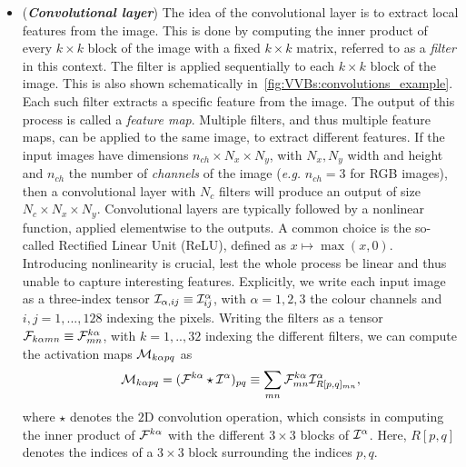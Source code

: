 \begin{itemize}
	\item (\textbf{\emph{Convolutional layer}})
		The idea of the convolutional layer is to extract local features from the image.
		This is done by computing the inner product of every $k\times k$ block of the image with a fixed $k\times k$ matrix, referred to as a \emph{filter} in this context. The filter is applied sequentially to each $k\times k$ block of the image. This is also shown schematically in~\cref{fig:VVBs:convolutions_example}.
		Each such filter extracts a specific feature from the image. The output of this process is called a \emph{feature map}. Multiple filters, and thus multiple feature maps, can be applied to the same image, to extract different features.
		If the input images have dimensions $n_{ch}\times N_x\times N_y$, with $N_x,N_y$ width and height and $n_{ch}$ the number of \emph{channels} of the image (\emph{e.g.} $n_{ch}=3$ for RGB images), then a convolutional layer with $N_c$ filters will produce an output of size $N_c\times N_x\times N_y$.
		Convolutional layers are typically followed by a nonlinear function, applied elementwise to the outputs. A common choice is the so-called Rectified Linear Unit (ReLU), defined as $x\mapsto\max(x,0)$.
		Introducing nonlinearity is crucial, lest the whole process be linear and thus unable to capture interesting features.
		Explicitly, we write each input image as a three-index tensor ${\mathcal{I}}_{\alpha,ij}\equiv{\mathcal{I}}^\alpha_{ij}$, with $\alpha=1,2,3$ the colour channels and $i,j=1,...,128$ indexing the pixels.
		Writing the filters as a tensor ${\mathcal{F}}_{k\alpha mn}\equiv{\mathcal{F}}^{k\alpha}_{mn}$, with $k=1,..,32$ indexing the different filters, we can compute the activation maps ${\mathcal{M}}_{k\alpha pq}$ as
		\begin{equation}
			{\mathcal{M}}_{k\alpha pq} = ({\mathcal{F}}^{k\alpha}\star{\mathcal{I}}^{\alpha})_{pq} \equiv
			\sum_{mn} {\mathcal{F}}^{k\alpha}_{mn} {\mathcal{I}}^\alpha_{R[p,q]_{mn}},
		\end{equation}
		where $\star$ denotes the $2$D convolution operation, which consists in computing the inner product of ${\mathcal{F}}^{k\alpha}$ with the different $3\times3$ blocks of ${\mathcal{I}}^\alpha$. Here, $R[p,q]$ denotes the indices of a $3\times3$ block surrounding the indices $p,q$.

\end{itemize}
